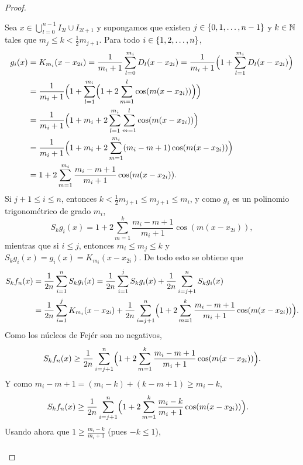 \documentclass[a4paper, 12pt, oneside]{book}
\begin{document}
\begin{proof}
\begin{itemize}
        Sea $x \in \bigcup_{l=0}^{n-1}I_{2l}\cup I_{2l+1}$ y supongamos que existen $j \in \{0,1,\mathellipsis,n-1\}$ y $k \in \mathbb N$ tales que $m_j \leq k < \frac{1}{2}m_{j+1}$. Para todo $i \in \{1,2,\mathellipsis,n\}$,
        \begin{align*}
            g_i(x) &= K_{m_i}(x-x_{2i}) = \frac{1}{m_i+1}\sum_{l=0}^{m_i}D_l(x-x_{2i}) = \frac{1}{m_i+1}\Bigl(1+\sum_{l=1}^{m_i}D_l(x-x_{2i})\Bigr)  \\
            &= \frac{1}{m_i+1}\Bigl(1+\sum_{l=1}^{m_i}\Bigl(1+2\sum_{m=1}^l \cos(m(x-x_{2i}))\Bigr)\Bigr) \\
            &= \frac{1}{m_i+1}\Bigl(1+m_i+2\sum_{l=1}^{m_i}\sum_{m=1}^l \cos(m(x-x_{2i}))\Bigr) \\
            &= \frac{1}{m_i+1}\Bigl(1+m_i+2\sum_{m=1}^{m_i}(m_i-m+1)\cos(m(x-x_{2i}))\Bigr) \\
            &= 1+2\sum_{m=1}^{m_i}\frac{m_i-m+1}{m_i+1}\cos(m(x-x_{2i})).
        \end{align*}
        Si $j+1 \leq i \leq n$, entonces $k < \frac{1}{2}m_{j+1} \leq m_{j+1} \leq m_i$, y como $g_i$ es un polinomio trigonométrico de grado $m_i$,
        \[S_{k}g_i(x) = 1+2\sum_{m=1}^{k}\frac{m_i-m+1}{m_i+1}\cos(m(x-x_{2i})),\]
        mientras que si $i \leq j$, entonces $m_i \leq m_{j} \leq k$ y $S_{k}g_i(x) = g_i(x) = K_{m_i}(x-x_{2i})$. De todo esto se obtiene que
        \begin{align*}
            S_{k}f_n(x) &= \frac{1}{2n}\sum_{i=1}^n S_{k}g_i(x) =  \frac{1}{2n}\sum_{i=1}^j S_{k}g_i(x)+ \frac{1}{2n}\sum_{i=j+1}^n S_{k}g_i(x)\\
            &= \frac{1}{2n}\sum_{i=1}^jK_{m_i}(x-x_{2i})+\frac{1}{2n}\sum_{i=j+1}^n \Bigl(1+2\sum_{m=1}^{k}\frac{m_i-m+1}{m_i+1}\cos(m(x-x_{2i}))\Bigr).
        \end{align*}
        Como los núcleos de Fejér son no negativos,
        \begin{align*}
            S_{k}f_n(x) \geq \frac{1}{2n}\sum_{i=j+1}^n \Bigl(1+2\sum_{m=1}^{k}\frac{m_i-m+1}{m_i+1}\cos(m(x-x_{2i}))\Bigr).
        \end{align*}
        Y como $m_i-m+1 = (m_i-k)+(k-m+1) \geq m_i-k$,
        \begin{align*}
            S_{k}f_n(x) &\geq \frac{1}{2n}\sum_{i=j+1}^n \Bigl(1+2\sum_{m=1}^{k}\frac{m_i-k}{m_i+1}\cos(m(x-x_{2i}))\Bigr).
        \end{align*}
        Usando ahora que $1 \geq \frac{m_i-k}{m_i+1}$ (pues $-k \leq 1$),
        \begin{align*}

\end{align*}
\end{itemize}
\end{proof}
\end{document}
